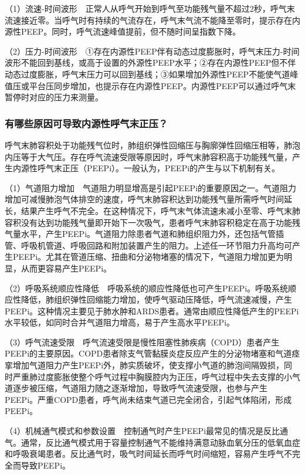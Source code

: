 （1）流速-时间波形　正常人从呼气开始到呼气至功能残气量不超过2秒，呼气末流速接近零。当呼气时有持续的气流存在，呼气末气流不能降至零时，提示存在内源性PEEP。同时，呼气流速峰值提前，但不随时间呈指数下降。

（2）压力-时间波形　①存在内源性PEEP伴有动态过度膨胀时，呼气末压力-时间波形不能回到基线，或高于设置的外源性PEEP水平；②存在内源性PEEP但不伴动态过度膨胀，呼气末压力可以回到基线；③如果增加外源性PEEP不能使气道峰值压或平台压同步增加，也提示存在内源性PEEP。内源性PEEP可以通过呼气末暂停时对应的压力来测量。

\subsubsection{有哪些原因可导致内源性呼气末正压？}

呼气末肺容积处于功能残气位时，肺组织弹性回缩压与胸廓弹性回缩压相等，肺泡内压等于大气压。存在呼气流速受限等原因时，呼气末肺容积高于功能残气量，产生内源性呼气末正压（PEEPi）。一般认为，PEEPi的产生与以下机制有关。

（1）气道阻力增加　气道阻力明显增高是引起PEEPi的重要原因之一。气道阻力增加可减慢肺泡气体排空的速度，呼气末肺容积达到功能残气量所需呼气时间延长，结果产生呼气不完全。在这种情况下，呼气末气体流速未减小至零、呼气末肺容积没有达到功能残气量即开始下一次吸气，患者呼气末肺容积稳定在高于功能残气量水平，产生PEEPi。气道阻力除患者气道和肺组织阻力外，还包括气管插管、呼吸机管道、呼吸回路和附加装置产生的阻力。上述任一环节阻力升高均可产生PEEPi。尤其在管道压缩、扭曲和分泌物堵塞的情况下，气道阻力增加更为明显，从而更容易产生PEEPi。

（2）呼吸系统顺应性降低　呼吸系统的顺应性降低也可产生PEEPi。呼吸系统顺应性降低，肺组织弹性回缩能力增加，使呼气驱动压降低，呼气流速减慢，产生PEEPi。这种情况主要见于肺水肿和ARDS患者。通常由顺应性降低产生的PEEPi水平较低，如同时合并气道阻力增高，易于产生高水平PEEPi。

（3）呼气流速受限　呼气流速受限是慢性阻塞性肺疾病（COPD）患者产生PEEPi的主要原因。COPD患者除支气管黏膜炎症反应产生的分泌物堵塞和气道痉挛增加气道阻力产生PEEPi外，肺实质破坏，使支撑小气道的肺泡间隔毁损，同时严重肺过度膨胀使整个呼气过程中胸膜腔内为正压，呼气过程中失去支撑的小气道逐步被压缩，气道阻力随之逐渐增加，导致呼气流速受限，也参与产生PEEPi。严重COPD患者，呼气尚未结束气道已完全闭合，引起气体陷闭，形成PEEPi。

（4）机械通气模式和参数设置　控制通气时产生PEEPi最常见的情况是反比通气。通常，反比通气模式用于容量控制通气不能维持满意动脉血氧分压的低氧血症和呼吸衰竭患者。反比通气时，吸气时间延长而呼气时间缩短，容易产生呼气不完全而导致PEEPi。

